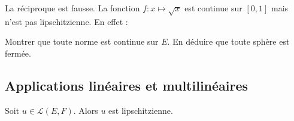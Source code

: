 \documentclass[french,11pt,twoside]{VcCours}
\begin{document}
\begin{Remarque}{} La réciproque est fausse. La fonction $f : x \mapsto \sqrt{x}$ est continue sur $[0,1]$ mais n'est pas lipschitzienne. En effet :

\vspace{6cm}
\end{Remarque}

\begin{ApplicationDirecte} Montrer que toute norme est continue sur $E$. En déduire que toute sphère est fermée.
\end{ApplicationDirecte}

\subsection{Applications linéaires et multilinéaires}

\begin{Theoreme}{} Soit $u \in \mathcal{L}(E,F)$. Alors $u$ est lipschitzienne.
\end{Theoreme}

\begin{Demonstration}{} 

\vspace{9cm}
\end{Demonstration}
\end{document}
